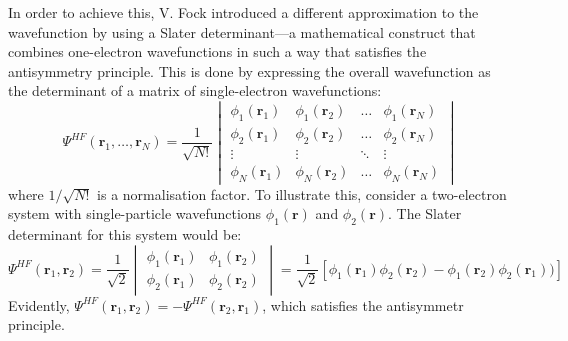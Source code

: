  In order to achieve this, V. Fock\supercite{Fock1930} introduced a different approximation to the wavefunction by using a Slater determinant---a mathematical construct that combines one-electron wavefunctions in such a way that satisfies the antisymmetry principle. This is done by expressing the overall wavefunction as the determinant of a matrix of single-electron wavefunctions:
\begin{equation}
  \Psi^{HF}(\mathbf{r}_1, \dots, \mathbf{r}_N) = \frac{1}{\sqrt{N!}} \begin{vmatrix}
    \phi_1(\mathbf{r}_1) & \phi_1(\mathbf{r}_2) & \dots & \phi_1(\mathbf{r}_N)\\
    \phi_2(\mathbf{r}_1) & \phi_2(\mathbf{r}_2) & \dots & \phi_2(\mathbf{r}_N)\\
    \vdots & \vdots & \ddots & \vdots\\
    \phi_N(\mathbf{r}_1) & \phi_N(\mathbf{r}_2) & \dots & \phi_N(\mathbf{r}_N)
  \end{vmatrix}
  \label{eq29}
\end{equation}
where $1/\sqrt{N!}$ is a normalisation factor. To illustrate this, consider a two-electron system with single-particle wavefunctions $\phi_1(\mathbf{r})$ and $\phi_2(\mathbf{r})$. The Slater determinant for this system would be:
\begin{equation}
  \Psi^{HF}(\mathbf{r}_1, \mathbf{r}_2) = \frac{1}{\sqrt{2}} \begin{vmatrix}
    \phi_1(\mathbf{r}_1) & \phi_1(\mathbf{r}_2)\\
    \phi_2(\mathbf{r}_1) & \phi_2(\mathbf{r}_2)
  \end{vmatrix} = \frac{1}{\sqrt{2}} \left[\phi_1(\mathbf{r}_1)\phi_2(\mathbf{r}_2) - \phi_1(\mathbf{r}_2)\phi_2(\mathbf{r}_1))\right]
  \label{eq30}
\end{equation}
Evidently, $\Psi^{HF}(\mathbf{r}_1, \mathbf{r}_2) = -\Psi^{HF}(\mathbf{r}_2, \mathbf{r}_1)$, which satisfies the antisymmetr principle. 
